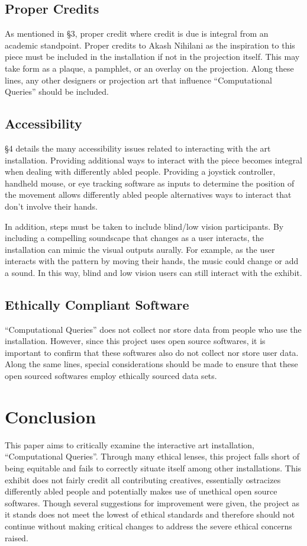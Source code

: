 \documentclass[10pt,twocolumn]{article}
\begin{document}
\subsection{Proper Credits}\label{subsec:credits}
As mentioned in \S 3, proper credit where credit is due is integral from an academic standpoint.  Proper credits to Akash Nihilani as the inspiration to this piece must be included in the installation if not in the projection itself. This may take form as a plaque, a pamphlet, or an overlay on the projection.  Along these lines, any other designers or projection art that influence ``Computational Queries'' should be included. 

\subsection{Accessibility}\label{subsec:accessibility}
\S 4 details the many accessibility issues related to interacting with the art installation. Providing additional ways to interact with the piece becomes integral when dealing with differently abled people. Providing a joystick controller, handheld mouse, or eye tracking software as inputs to determine the position of the movement allows differently abled people alternatives ways to interact that don't involve their hands. 

In addition, steps must be taken to include blind/low vision participants. By including a compelling soundscape that changes as a user interacts, the installation can mimic the visual outputs aurally. For example, as the user interacts with the pattern by moving their hands, the music could change or add a sound.  In this way, blind and low vision users can still interact with the exhibit. 

\subsection{Ethically Compliant Software}\label{subsec:software}
``Computational Queries'' does not collect nor store data from people who use the installation. However, since this project uses open source softwares, it is important to confirm that these softwares also do not collect nor store user data. Along the same lines, special considerations should be made to ensure that these open sourced softwares employ ethically sourced data sets. 

\section{Conclusion}\label{sec:conclusion}
This paper aims to critically examine the interactive art installation, ``Computational Queries''. Through many ethical lenses, this project falls short of being equitable and fails to correctly situate itself among other installations.  This exhibit does not fairly credit all contributing creatives, essentially ostracizes differently abled people and potentially makes use of unethical open source softwares. Though several suggestions for improvement were given, the project as it stands does not meet the lowest of ethical standards and therefore should not continue without making critical changes to address the severe ethical concerns raised. 

\printbibliography 
\end{document}
